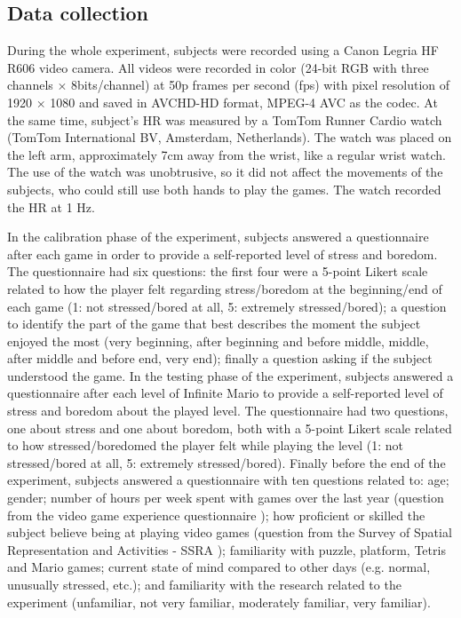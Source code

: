 \subsection{Data collection}

During the whole experiment, subjects were recorded using a Canon Legria HF R606 video camera. All videos were recorded in color (24-bit RGB with three channels $\times$ 8bits/channel) at 50p frames per second (fps) with pixel resolution of 1920 $\times$ 1080 and saved in AVCHD-HD format, MPEG-4 AVC as the codec. At the same time, subject's HR was measured by a TomTom Runner Cardio watch (TomTom International BV, Amsterdam, Netherlands). The watch was placed on the left arm, approximately 7cm away from the wrist, like a regular wrist watch. The use of the watch was unobtrusive, so it did not affect the movements of the subjects, who could still use both hands to play the games. The watch recorded the HR at 1 Hz.

In the calibration phase of the experiment, subjects answered a questionnaire after each game in order to provide a self-reported level of stress and boredom. The questionnaire had six questions: the first four were a 5-point Likert scale related to how the player felt regarding stress/boredom at the beginning/end of each game (1: not stressed/bored at all, 5: extremely stressed/bored); a question to identify the part of the game that best describes the moment the subject enjoyed the most (very beginning, after beginning and before middle, middle, after middle and before end, very end); finally a question asking if the subject understood the game. In the testing phase of the experiment, subjects answered a questionnaire after each level of Infinite Mario to provide a self-reported level of stress and boredom about the played level. The questionnaire had two questions, one about stress and one about boredom, both with a 5-point Likert scale related to how stressed/boredomed the player felt while playing the level (1: not stressed/bored at all, 5: extremely stressed/bored). Finally before the end of the experiment, subjects answered a questionnaire with ten questions related to: age; gender; number of hours per week spent with games over the last year (question from the video game experience questionnaire \parencite{unsworth2015playing}); how proficient or skilled the subject believe being at playing video games (question from the Survey of Spatial Representation and Activities - SSRA \parencite{terlecki2005important}); familiarity with puzzle, platform, Tetris and Mario games; current state of mind compared to other days (e.g. normal, unusually stressed, etc.); and familiarity with the research related to the experiment (unfamiliar, not very familiar, moderately familiar, very familiar).

